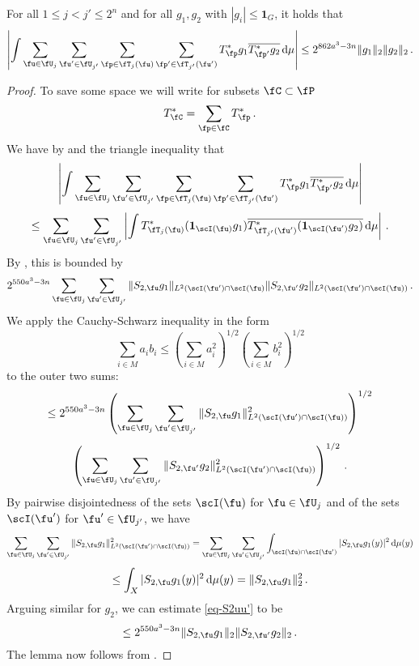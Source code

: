 \begin{lemma}
    \label{row-correlation}
    \leanok
    For all $1 \le j < j' \le 2^n$ and for all $g_1, g_2$ with $|g_i| \le \mathbf{1}_G$, it holds that
    $$
        \left| \int \sum_{\fu \in \fU_j} \sum_{\fu' \in \fU_{j'}} \sum_{\fp \in \fT_j(\fu)} \sum_{\fp' \in \fT_{j'}(\fu')} T^*_{\fp} g_1 \overline{T^*_{\fp'} g_2} \, \mathrm{d}\mu \right| \le
        2^{862a^3-3n}\|g_1\|_2 \|g_2\|_2\,.
    $$
\end{lemma}

\begin{proof}
    To save some space we will write for subsets $\fC \subset \fP$
    $$
        T_{\fC}^* = \sum_{\fp \in \fC} T_{\fp}^*\,.
    $$
    We have by  and the triangle inequality that
    $$
        \left| \int \sum_{\fu \in \fU_j} \sum_{\fu' \in \fU_{j'}} \sum_{\fp \in \fT_j(\fu)} \sum_{\fp' \in \fT_{j'}(\fu')} T^*_{\fp} g_1 \overline{T^*_{\fp'} g_2} \, \mathrm{d}\mu \right|
    $$
    $$
        \le \sum_{\fu \in \fU_j} \sum_{\fu' \in \fU_{j'}} \left| \int T^*_{\fT_j(\fu)} (\mathbf{1}_{\scI(\fu)} g_1) \overline{T^*_{\fT_{j'}(\fu')} (\mathbf{1}_{\scI(\fu')} g_2)} \, \mathrm{d}\mu \right|\,.
    $$
    By , this is bounded by
    \begin{equation}
        \label{eq-S2uu'}
         2^{550a^3-3n} \sum_{\fu \in \fU_j} \sum_{\fu' \in \fU_{j'}} \|S_{2,\fu} g_1\|_{L^2(\scI(\fu')\cap \scI(\fu)} \|S_{2, \fu'} g_2\|_{L^2(\scI(\fu')\cap\scI(\fu))}\,.
    \end{equation}
    We apply the Cauchy-Schwarz inequality in the form
    \begin{equation*}
        \sum_{i \in M} a_i b_i \le (\sum_{i \in M} a_i^2 )^{1/2}(\sum_{i \in M} b_i^2 )^{1/2}
    \end{equation*} to the outer two sums:
    $$
        \le 2^{550a^3-3n} \left(\sum_{\fu \in \fU_j} \sum_{\fu' \in \fU_{j'}} \|S_{2,\fu} g_1\|_{L^2(\scI(\fu')\cap \scI(\fu))}^2 \right)^{1/2}
    $$
    $$
        \left(\sum_{\fu \in \fU_j} \sum_{\fu' \in \fU_{j'}} \|S_{2,\fu'} g_2\|_{L^2(\scI(\fu')\cap\scI(\fu))}^2 \right)^{1/2}\,.
    $$
    By pairwise disjointedness of the sets $\scI(\fu)$ for $\fu \in \fU_j$ and of the sets $\scI(\fu')$ for $\fu' \in \fU_{j'}$, we have
    $$
        \sum_{\fu \in \fU_j}\sum_{\fu' \in \fU_{j'}} \|S_{2,\fu} g_1\|_{L^2(\scI(\fu')\cap \scI(\fu))}^2
        = \sum_{\fu \in \fU_j}\sum_{\fu' \in \fU_{j'}} \int_{\scI(\fu) \cap \scI(\fu')} |S_{2,\fu} g_1(y)|^2 \, \mathrm{d}\mu(y)
    $$
    $$
        \le \int_X |S_{2,\fu}g_1(y)|^2 \, \mathrm{d}\mu(y) = \|S_{2,\fu} g_1\|_2^2\,.
    $$
    Arguing similar for $g_2$, we can estimate \eqref{eq-S2uu'} to be
    $$
        \le 2^{550a^3-3n} \|S_{2,\fu}g_1\|_2 \|S_{2,\fu'} g_2\|_2\,.
    $$
    The lemma now follows from .
\end{proof}

